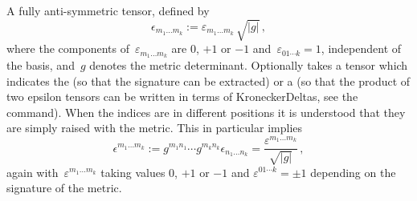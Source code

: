 
A fully anti-symmetric tensor, defined by
\begin{equation}
\epsilon_{m_1\ldots m_k} := \varepsilon_{m_1\ldots m_k}\,\sqrt{|g|}\,,
\end{equation}
where the components of~$\varepsilon_{m_1\ldots m_k}$ are 0, $+1$ or $-1$
and~$\varepsilon_{01\cdots k}=1$,
independent of the basis, and~$g$ denotes the metric
determinant. Optionally takes a tensor which indicates the
 (so that the signature can be extracted) or a
 (so that the product of two epsilon tensors
can be written in terms of KroneckerDeltas, see the
 command). When the indices are in
different positions it is understood that they are simply raised with
the metric. This in particular implies
\begin{equation}
\epsilon^{m_1\ldots m_k} := g^{m_1 n_1} \cdots g^{m_k n_k} 
\epsilon_{n_1\ldots n_k} = \frac{\varepsilon^{m_1\ldots m_k}}{\sqrt{|g|}}\,,
\end{equation}
again with~$\varepsilon^{m_1\ldots m_k}$ taking values 0, $+1$ or $-1$
and $\varepsilon^{01\cdots k}=\pm 1$ depending on the signature of the
metric.

